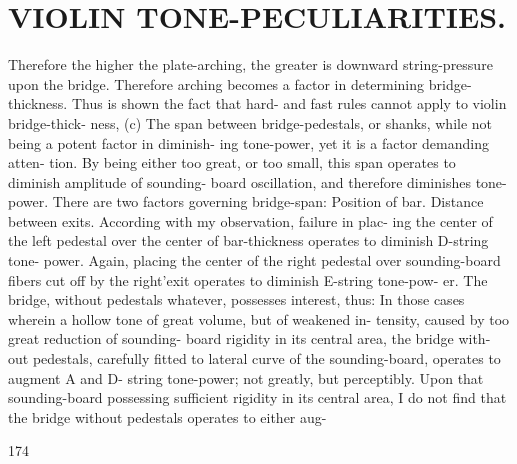 \documentclass{article}
\begin{document}
\section*{VIOLIN TONE-PECULIARITIES.}
Therefore the higher the plate-arching, the greater is downward string-pressure upon the bridge. Therefore arching becomes a factor in determining bridge-thickness. Thus is shown the fact that hard- and fast rules cannot apply to violin bridge-thick- ness, (c) The span between bridge-pedestals, or shanks, while not being a potent factor in diminish- ing tone-power, yet it is a factor demanding atten- tion. By being either too great, or too small, this span operates to diminish amplitude of sounding- board oscillation, and therefore diminishes tone- power. There are two factors governing bridge-span: Position of bar. Distance between exits. According with my observation, failure in plac- ing the center of the left pedestal over the center of bar-thickness operates to diminish D-string tone- power. Again, placing the center of the right pedestal over sounding-board fibers cut off by the right'exit operates to diminish E-string tone-pow- er. The bridge, without pedestals whatever, possesses interest, thus: In those cases wherein a hollow tone of great volume, but of weakened in- tensity, caused by too great reduction of sounding- board rigidity in its central area, the bridge with- out pedestals, carefully fitted to lateral curve of the sounding-board, operates to augment A and D- string tone-power; not greatly, but perceptibly. Upon that sounding-board possessing sufficient rigidity in its central area, I do not find that the bridge without pedestals operates to either aug-

174
\end{document}
